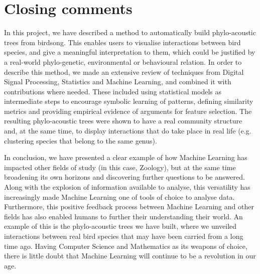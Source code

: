 \documentclass[../main.tex]{subfiles}
\begin{document}
\section{Closing comments}
In this project, we have described a method to automatically build phylo-acoustic trees from birdsong. This enables users to visualise interactions between bird species, and give a meaningful interpretation to them, which could be justified by a real-world phylo-genetic, environmental or behavioural relation. In order to describe this method, we made an extensive review of techniques from Digital Signal Processing, Statistics and Machine Learning, and combined it with contributions where needed. These included using statistical models as intermediate steps to encourage symbolic learning of patterns, defining similarity metrics and providing empirical evidence of arguments for feature selection. The resulting phylo-acoustic trees were shown to have a real community structure and, at the same time, to display interactions that do take place in real life (e.g. clustering species that belong to the same genus).
\par In conclusion, we have presented a clear example of how Machine Learning has impacted other fields of study (in this case, Zoology), but at the same time broadening its own horizons and discovering further questions to be answered. Along with the explosion of information available to analyse, this versatility has increasingly made Machine Learning one of tools of choice to analyse data. Furthermore, this positive feedback process between Machine Learning and other fields has also enabled humans to further their understanding their world. An example of this is the phylo-acoustic trees we have built, where we unveiled interactions between real bird species that may have been carried from a long time ago. Having Computer Science and Mathematics as its weapons of choice, there is little doubt that Machine Learning will continue to be a revolution in our age.
\end{document}
